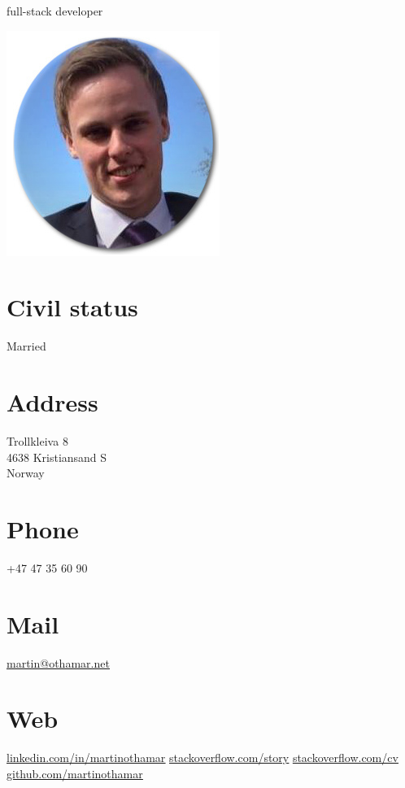 \documentclass[]{cv-class}
\begin{document}
      {full-stack developer}

\vspace{1.15cm}

\begin{aside}
  \includegraphics[scale=0.40]{img/meg2.jpg}
    ~
  \vspace{0.65cm}
  \section{Civil status}
    Married
  	~
  \section{Address}
    Trollkleiva 8\\
    4638 Kristiansand S\\
    Norway
    ~
  \section{Phone}
    +47 47 35 60 90
    ~
  \section{Mail}
    \underline{\href{mailto:martin@othamar.net}{martin@othamar.net}}
    ~
  \section{Web}
	\vspace{0.10cm}
    \underline{\href{https://no.linkedin.com/in/martinothamar}{linkedin.com/in/martinothamar}}
	\vspace{0.10cm}
    \underline{\href{https://stackoverflow.com/story/martinothamar}{stackoverflow.com/story}}
	\vspace{0.10cm}
    \underline{\href{https://stackoverflow.com/cv/martinothamar}{stackoverflow.com/cv}}
	\vspace{0.10cm}
    \underline{\href{https://github.com/martinothamar}{github.com/martinothamar}}
    ~

\end{aside}
\end{document}
